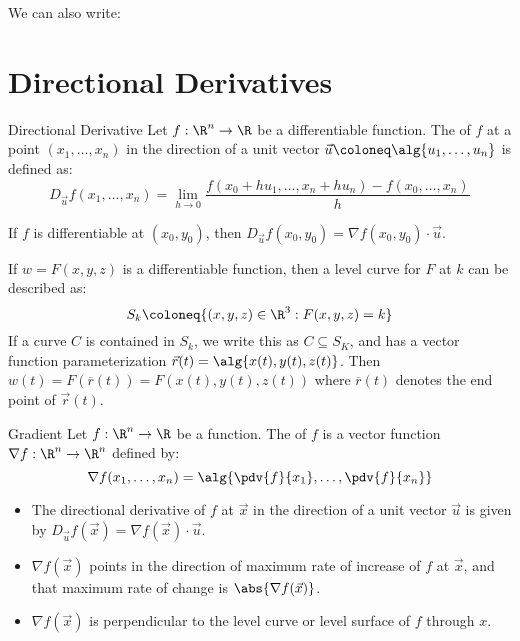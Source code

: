We can also write:

\section{Directional Derivatives}

\begin{dfnbox}{Directional Derivative}{}
    Let $f : \R^n \to \R$ be a differentiable function. The  of $f$ at a point $(x_1, \ldots, x_n)$ in the direction of a unit vector $\vec{u} \coloneq \alg{u_1, \ldots, u_n}$ is defined as:
    \[ D_{\vec{u}} f(x_1, \ldots, x_n) = \lim_{h \to 0} \frac{f(x_0 + hu_1, \ldots, x_n + hu_n) - f(x_0, \ldots, x_n)}{h} \]
\end{dfnbox}

\begin{thmbox}{}{}
    If $f$ is differentiable at $(x_0, y_0)$, then $D_{\vec{u}} f (x_0, y_0) = \nabla f(x_0, y_0) \cdot \vec{u}$.
\end{thmbox}

If $w = F(x,y,z)$ is a differentiable function, then a level curve for $F$ at $k$ can be described as:
\[ S_k \coloneq \{ (x,y,z) \in \R^3 : F(x,y,z) = k \} \]
If a curve $C$ is contained in $S_k$, we write this as $C \subseteq S_K$, and has a vector function parameterization $\vec{r}(t) = \alg{x(t), y(t), z(t)}$. Then $w(t) = F(\overline{r}(t)) = F(x(t), y(t), z(t))$ where $\overline{r}(t)$ denotes the end point of $\vec{r}(t)$.

\begin{dfnbox}{Gradient}{}
    Let $f : \R^n \to \R$ be a function. The  of $f$ is a vector function $\nabla f: \R^n \to \R^n$ defined by:
    \[ \nabla f(x_1, \ldots, x_n) = \alg{ \pdv{f}{x_1}, \ldots, \pdv{f}{x_n} } \]
\end{dfnbox}

\begin{itemize}
    \item The directional derivative of $f$ at $\vec{x}$ in the direction of a unit vector $\vec{u}$ is given by $D_{\vec{u}}f(\vec{x}) = \nabla f(\vec{x}) \cdot \vec{u}$.
    \item $\nabla f(\vec{x})$ points in the direction of maximum rate of increase of $f$ at $\vec{x}$, and that maximum rate of change is $\abs{\nabla f(\vec{x})}$.
    \item $\nabla f(\vec{x})$ is perpendicular to the level curve or level surface of $f$ through $x$.
\end{itemize}


